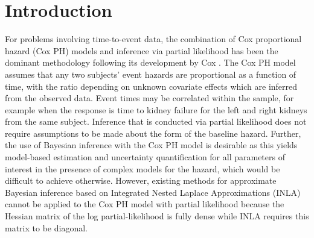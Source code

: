 \documentclass[ba]{imsart}
\begin{document}






%


\section{Introduction}\label{sec1}
For problems involving time-to-event data, the combination of Cox proportional hazard (Cox PH) models and inference via partial likelihood has been the dominant methodology following its development by Cox \citep{coxph}. The Cox PH model assumes that any two subjects' event hazards are proportional as a function of time, with the ratio depending on unknown covariate effects which are inferred from the observed data. Event times may be correlated within the sample, for example when the response is time to kidney failure for the left and right kidneys from the same subject. Inference that is conducted via partial likelihood does not require assumptions to be made about the form of the baseline hazard. Further, the use of Bayesian inference with the Cox PH model is desirable as this yields model-based estimation and uncertainty quantification for all parameters of interest in the presence of complex models for the hazard, which would be difficult to achieve otherwise. However, existing methods for approximate Bayesian inference based on Integrated Nested Laplace Approximations (INLA) \citep{inla} cannot be applied to the Cox PH model with partial likelihood because the Hessian matrix of the log partial-likelihood is fully dense while INLA requires this matrix to be diagonal.
\end{document}
